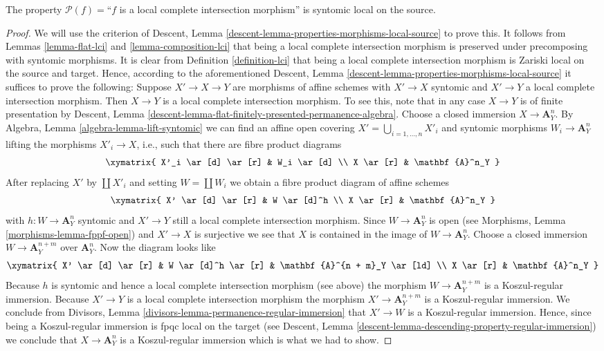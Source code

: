 \begin{lemma}
\label{lemma-lci-syntomic-local-source}
The property $\mathcal{P}(f) =$``$f$ is a local complete intersection
morphism'' is syntomic local on the source.
\end{lemma}

\begin{proof}
We will use the criterion of
Descent, Lemma \ref{descent-lemma-properties-morphisms-local-source}
to prove this. It follows from
Lemmas \ref{lemma-flat-lci} and
\ref{lemma-composition-lci}
that being a local complete intersection morphism is preserved under
precomposing with syntomic morphisms. It is clear from
Definition \ref{definition-lci}
that being a local complete intersection morphism is Zariski local on the
source and target. Hence, according to the aforementioned
Descent, Lemma \ref{descent-lemma-properties-morphisms-local-source}
it suffices to prove the following: Suppose $X' \to X \to Y$ are
morphisms of affine schemes with $X' \to X$ syntomic and $X' \to Y$
a local complete intersection morphism. Then $X \to Y$ is a local complete
intersection morphism. To see this, note that in any case $X \to Y$ is of
finite presentation by
Descent, Lemma \ref{descent-lemma-flat-finitely-presented-permanence-algebra}.
Choose a closed immersion $X \to \mathbf{A}^n_Y$. By
Algebra, Lemma \ref{algebra-lemma-lift-syntomic}
we can find an affine open covering $X' = \bigcup_{i = 1, \ldots, n} X'_i$
and syntomic morphisms $W_i \to \mathbf{A}^n_Y$ lifting the morphisms
$X'_i \to X$, i.e., such that there are fibre product diagrams
$$
\xymatrix{
X'_i \ar[d] \ar[r] & W_i \ar[d] \\
X \ar[r] & \mathbf{A}^n_Y
}
$$
After replacing $X'$ by $\coprod X'_i$ and setting $W = \coprod W_i$
we obtain a fibre product diagram of affine schemes
$$
\xymatrix{
X' \ar[d] \ar[r] & W \ar[d]^h \\
X \ar[r] & \mathbf{A}^n_Y
}
$$
with $h : W \to \mathbf{A}^n_Y$ syntomic and $X' \to Y$ still a local complete
intersection morphism. Since $W \to \mathbf{A}^n_Y$ is open (see
Morphisms, Lemma \ref{morphisms-lemma-fppf-open})
and $X' \to X$ is surjective we see that $X$ is contained in the image
of $W \to \mathbf{A}^n_Y$. Choose a closed immersion
$W \to \mathbf{A}^{n + m}_Y$ over $\mathbf{A}^n_Y$. Now the diagram looks like
$$
\xymatrix{
X' \ar[d] \ar[r] & W \ar[d]^h \ar[r] & \mathbf{A}^{n + m}_Y \ar[ld] \\
X \ar[r] & \mathbf{A}^n_Y
}
$$
Because $h$ is syntomic and hence a local complete intersection morphism (see
above) the morphism $W \to \mathbf{A}^{n + m}_Y$ is a Koszul-regular immersion.
Because $X' \to Y$ is a local complete intersection morphism the morphism
$X' \to \mathbf{A}^{n + m}_Y$ is a Koszul-regular immersion. We conclude from
Divisors, Lemma \ref{divisors-lemma-permanence-regular-immersion}
that $X' \to W$ is a Koszul-regular immersion. Hence, since being
a Koszul-regular immersion is fpqc local on the target (see
Descent, Lemma \ref{descent-lemma-descending-property-regular-immersion})
we conclude that $X \to \mathbf{A}^n_Y$ is a Koszul-regular immersion
which is what we had to show.
\end{proof}

